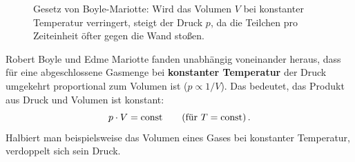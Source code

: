 \begin{figure}[tb]
    \centering
    \caption{Gesetz von Boyle-Mariotte: Wird das Volumen $V$ bei konstanter Temperatur verringert, steigt der Druck $p$, da die Teilchen pro Zeiteinheit öfter gegen die Wand stoßen.}\label{fig: kolben_zylinder_gas_pV}
\end{figure}

Robert Boyle und Edme Mariotte fanden unabhängig voneinander heraus, dass für eine abgeschlossene Gasmenge bei \textbf{konstanter Temperatur} der Druck umgekehrt proportional zum Volumen ist ($p \propto 1/V$). Das bedeutet, das Produkt aus Druck und Volumen ist konstant:
\begin{equation}\label{eq: boyle_mariotte_gesetz}
    p \cdot V = \mathrm{const} \qquad (\text{für } T = \mathrm{const}) \,.
\end{equation}
Halbiert man beispielsweise das Volumen eines Gases bei konstanter Temperatur, verdoppelt sich sein Druck.
